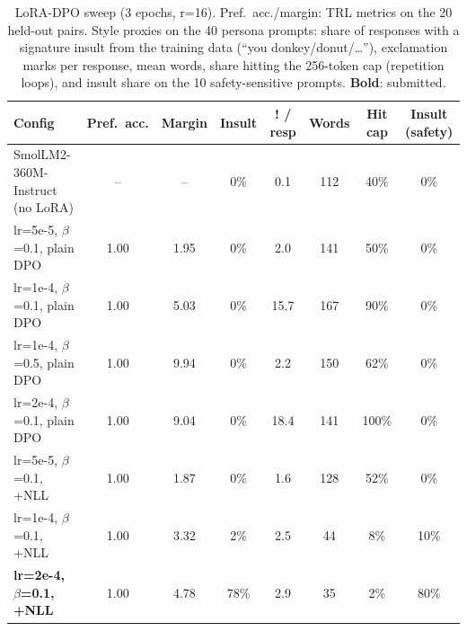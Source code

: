\begin{table}[H]\centering\small
\caption{LoRA-DPO sweep (3 epochs, r=16). Pref.\ acc./margin: TRL metrics on the 20 held-out pairs. Style proxies on the 40 persona prompts: share of responses with a signature insult from the training data (``you donkey/donut/\ldots''), exclamation marks per response, mean words, share hitting the 256-token cap (repetition loops), and insult share on the 10 safety-sensitive prompts. \textbf{Bold}: submitted.}
\label{tab:sweep}
\begin{tabular}{lccccccc}
\toprule
Config & Pref.\ acc. & Margin & Insult & ! / resp & Words & Hit cap & Insult (safety) \\
\midrule
SmolLM2-360M-Instruct (no LoRA) & -- & -- & 0\% & 0.1 & 112 & 40\% & 0\% \\
lr=5e-5, $\beta$=0.1, plain DPO & 1.00 & 1.95 & 0\% & 2.0 & 141 & 50\% & 0\% \\
lr=1e-4, $\beta$=0.1, plain DPO & 1.00 & 5.03 & 0\% & 15.7 & 167 & 90\% & 0\% \\
lr=1e-4, $\beta$=0.5, plain DPO & 1.00 & 9.94 & 0\% & 2.2 & 150 & 62\% & 0\% \\
lr=2e-4, $\beta$=0.1, plain DPO & 1.00 & 9.04 & 0\% & 18.4 & 141 & 100\% & 0\% \\
lr=5e-5, $\beta$=0.1, +NLL & 1.00 & 1.87 & 0\% & 1.6 & 128 & 52\% & 0\% \\
lr=1e-4, $\beta$=0.1, +NLL & 1.00 & 3.32 & 2\% & 2.5 & 44 & 8\% & 10\% \\
\textbf{lr=2e-4, $\beta$=0.1, +NLL} & 1.00 & 4.78 & 78\% & 2.9 & 35 & 2\% & 80\% \\
\bottomrule
\end{tabular}
\end{table}
